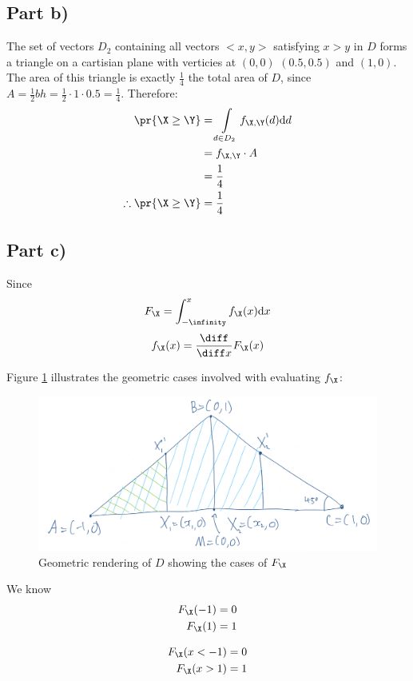 \subsection{Part b)}

The set of vectors $D_2$ containing all vectors $<x, y>$ satisfying $x > y$ in $D$ forms a triangle on a cartisian plane
with verticies at $(0, 0)$ $(0.5, 0.5)$ and $(1, 0)$. The area of this triangle is exactly $\frac{1}{4}$ the
total area of $D$, since $A = \frac{1}{2}bh = \frac{1}{2} \cdot 1 \cdot 0.5 = \frac{1}{4}$. Therefore:
\begin{align*}
\pr{\X \geq \Y} &= \int \limits _{d \in D_2} f_{\X, \Y}(d)\mathrm{d}d \\
&= f_{\X, \Y} \cdot A \\
&= \frac{1}{4} \\
\therefore \pr{\X \geq \Y} &= \frac{1}{4}
\end{align*}

\subsection{Part c)}

Since
\[
F_\X = \int _{-\infinity} ^{x} f_\X(x)\mathrm{d}x
\]
\[
f_\X(x) = \frac{\diff}{\diff x}F_\X(x)
\]


Figure \ref{fig:q2c-x} illustrates the geometric cases involved with evaluating $f_{\X}$:

\begin{figure}[th]
	\includegraphics[width=1 \textwidth]{Q2c X diagram.png}
	\caption{Geometric rendering of $D$ showing the cases of $F_\X$}
	\label{fig:q2c-x}
\end{figure}

\begin{multicols}{2}
We know
\begin{align*}
F_\X(-1) &= 0 \\
F_\X(1) &= 1
\end{align*}

\begin{align*}
F_\X(x < -1) &= 0 \\
F_\X(x > 1) &= 1
\end{align*}
\end{multicols}

